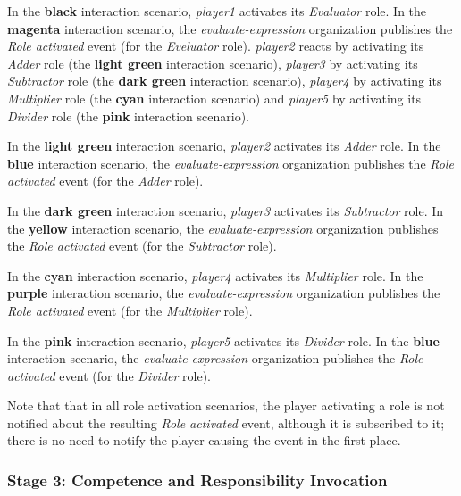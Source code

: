 In the \textbf{black} interaction scenario, \textit{player1} activates its \textit{Evaluator} role.
In the \textbf{magenta} interaction scenario, the \textit{evaluate-expression} organization publishes the \textit{Role activated} event (for the \textit{Eveluator} role).
\textit{player2} reacts by activating its \textit{Adder} role (the \textbf{light green} interaction scenario), \textit{player3} by activating its \textit{Subtractor} role (the \textbf{dark green} interaction scenario), \textit{player4} by activating its \textit{Multiplier} role (the \textbf{cyan} interaction scenario) and \textit{player5} by activating its \textit{Divider} role (the \textbf{pink} interaction scenario).

In the \textbf{light green} interaction scenario, \textit{player2} activates its \textit{Adder} role.
In the \textbf{blue} interaction scenario, the \textit{evaluate-expression} organization publishes the \textit{Role activated} event (for the \textit{Adder} role).

In the \textbf{dark green} interaction scenario, \textit{player3} activates its \textit{Subtractor} role.
In the \textbf{yellow} interaction scenario, the \textit{evaluate-expression} organization publishes the \textit{Role activated} event (for the \textit{Subtractor} role).

In the \textbf{cyan} interaction scenario, \textit{player4} activates its \textit{Multiplier} role.
In the \textbf{purple} interaction scenario, the \textit{evaluate-expression} organization publishes the \textit{Role activated} event (for the \textit{Multiplier} role).

In the \textbf{pink} interaction scenario, \textit{player5} activates its \textit{Divider} role.
In the \textbf{blue} interaction scenario, the \textit{evaluate-expression} organization publishes the \textit{Role activated} event (for the \textit{Divider} role).

Note that that in all role activation scenarios, the player activating a role is not notified about the resulting \textit{Role activated} event, although it is subscribed to it; there is no need to notify the player causing the event in the first place.

\subsubsection*{Stage 3: Competence and Responsibility Invocation}

